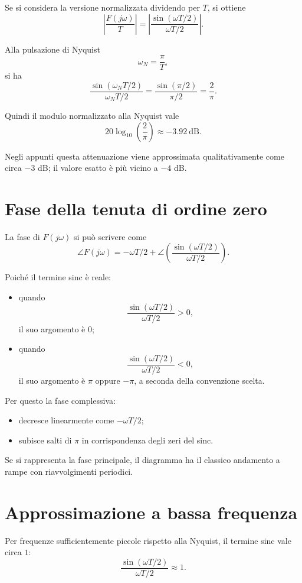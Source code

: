 Se si considera la versione normalizzata dividendo per \(T\), si ottiene
\[
\left|\frac{F(j\omega)}{T}\right|
=
\left|\frac{\sin(\omega T/2)}{\omega T/2}\right|.
\]

Alla pulsazione di Nyquist
\[
\omega_N=\frac{\pi}{T},
\]
si ha
\[
\frac{\sin(\omega_N T/2)}{\omega_N T/2}
=
\frac{\sin(\pi/2)}{\pi/2}
=
\frac{2}{\pi}.
\]

Quindi il modulo normalizzato alla Nyquist vale
\[
20\log_{10}\!\left(\frac{2}{\pi}\right)\approx -3.92\ \mathrm{dB}.
\]

Negli appunti questa attenuazione viene approssimata qualitativamente come circa \(-3\) dB;
il valore esatto è più vicino a \(-4\) dB.

\section{Fase della tenuta di ordine zero}

La fase di \(F(j\omega)\) si può scrivere come
\[
\angle F(j\omega)
=
-\omega T/2
+
\angle\!\left(\frac{\sin(\omega T/2)}{\omega T/2}\right).
\]

Poiché il termine sinc è reale:
\begin{itemize}
    \item quando
    \[
    \frac{\sin(\omega T/2)}{\omega T/2}>0,
    \]
    il suo argomento è \(0\);
    \item quando
    \[
    \frac{\sin(\omega T/2)}{\omega T/2}<0,
    \]
    il suo argomento è \(\pi\) oppure \(-\pi\), a seconda della convenzione scelta.
\end{itemize}

Per questo la fase complessiva:
\begin{itemize}
    \item decresce linearmente come \(-\omega T/2\);
    \item subisce salti di \(\pi\) in corrispondenza degli zeri del sinc.
\end{itemize}

Se si rappresenta la fase principale, il diagramma ha il classico andamento a rampe
con riavvolgimenti periodici.

\section{Approssimazione a bassa frequenza}

Per frequenze sufficientemente piccole rispetto alla Nyquist, il termine sinc vale circa \(1\):
\[
\frac{\sin(\omega T/2)}{\omega T/2}\approx 1.
\]

